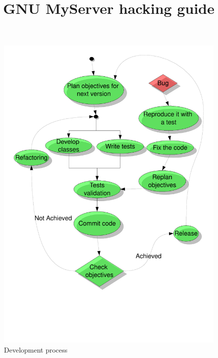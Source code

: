 \documentclass[12pt]{article}
\date{}
\author{}
\title{GNU MyServer hacking guide}
\begin{document}
\maketitle

\begin{figure}[H]
  \begin{center}
    \includegraphics[height=0.9\textheight]{dev_scheme}
  \end{center}
  \caption{Development process}
  \label{figure:dev_proc}
\end{figure}
\end{document}
